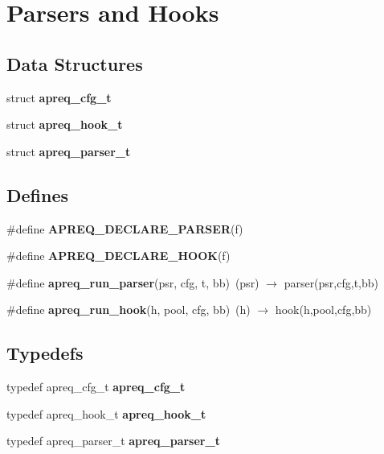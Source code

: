 \section{Parsers and Hooks}
\label{group__parsers}
\subsection*{Data Structures}
\begin{CompactItemize}
\item 
struct {\bf apreq\_\-cfg\_\-t}
\item 
struct {\bf apreq\_\-hook\_\-t}
\item 
struct {\bf apreq\_\-parser\_\-t}
\end{CompactItemize}
\subsection*{Defines}
\begin{CompactItemize}
\item 
\#define {\bf APREQ\_\-DECLARE\_\-PARSER}(f)
\item 
\#define {\bf APREQ\_\-DECLARE\_\-HOOK}(f)
\item 
\#define {\bf apreq\_\-run\_\-parser}(psr, cfg, t, bb)\ (psr) $\rightarrow$ parser(psr,cfg,t,bb)\label{group__parsers_a13}

\item 
\#define {\bf apreq\_\-run\_\-hook}(h, pool, cfg, bb)\ (h) $\rightarrow$ hook(h,pool,cfg,bb)\label{group__parsers_a14}

\end{CompactItemize}
\subsection*{Typedefs}
\begin{CompactItemize}
\item 
typedef apreq\_\-cfg\_\-t {\bf apreq\_\-cfg\_\-t}
\item 
typedef apreq\_\-hook\_\-t {\bf apreq\_\-hook\_\-t}\label{group__parsers_a1}

\item 
typedef apreq\_\-parser\_\-t {\bf apreq\_\-parser\_\-t}\label{group__parsers_a2}

\end{CompactItemize}
